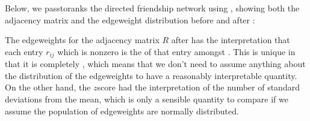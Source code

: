 \documentclass[letterpaper,10pt,english]{jupyterBook}
\begin{document}
\sphinxAtStartPar
Below, we pass\sphinxhyphen{}to\sphinxhyphen{}ranks the directed friendship network using , showing both the adjacency matrix and the edge\sphinxhyphen{}weight distribution before and after :

\begin{sphinxVerbatim}[commandchars=\\\{\}]
   

  
\end{sphinxVerbatim}

\sphinxAtStartPar
The edge\sphinxhyphen{}weights for the adjacency matrix \(R\) after  has the interpretation that each entry \(r_{ij}\) which is non\sphinxhyphen{}zero is the  of that entry amongst . This is unique in that it is completely , which means that we don’t need to assume anything about the distribution of the edge\sphinxhyphen{}weights to have a reasonably interpretable quantity. On the other hand, the \(z\)\sphinxhyphen{}score had the interpretation of the number of standard deviations from the mean, which is only a sensible quantity to compare if we assume the population of edge\sphinxhyphen{}weights are normally distributed.
\end{document}
